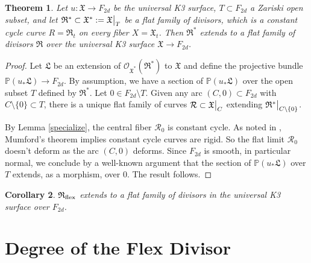 \documentclass{amsart}
\newtheorem{theorem}{Theorem}[section]
\newtheorem{corollary}[theorem]{Corollary}
\theoremstyle{definition}
\begin{document}
\begin{theorem} Let $u\colon \mathfrak{X}\to F_{2d}$ be the universal K3 surface,
$T\subset F_{2d}$ a Zariski open subset,
and let $\mathfrak{R}^*\subset \mathfrak{X}^*:=\mathfrak{X}\big{|}_T$
be a flat family of divisors, which is a constant cycle curve $R=\mathfrak{R}_t$
on every fiber $X=\mathfrak{X}_t$. Then $\mathfrak{R}^*$ extends to a flat family of divisors
$\mathfrak{R}$ over the universal K3 surface $\mathfrak{X}\to F_{2d}$. \end{theorem}

\begin{proof} Let $\mathfrak{L}$ be an extension of
$\mathcal{O}_{\mathfrak{X}^*}(\mathfrak{R}^*)$ to $\mathfrak{X}$ and define
the projective bundle $\mathbb{P}(u_*\mathfrak{L})\to F_{2d}$. By assumption,
we have a section of $\mathbb{P}(u_*\mathfrak{L})$ over the open subset $T$
defined by $\mathfrak{R}^*$.
Let $0\in F_{2d}\setminus T$. Given any arc $(C,0)\subset F_{2d}$ with
$C\setminus \{0\}\subset T$, there is a unique flat family of curves
$\mathcal{R}\subset \mathfrak{X}\big{|}_C$ extending
$\mathfrak{R}^*\big{|}_{C\setminus \{0\}}$.

By Lemma \ref{specialize},
the central fiber $\mathcal{R}_0$ is constant cycle. 
As noted in \cite[Sec.~2.3]{huybrechts2013curves},
Mumford's theorem \cite{mumford1969rational}
implies constant cycle curves are rigid.
So the flat limit $\mathcal{R}_0$ doesn't deform as the arc
$(C,0)$ deforms. Since $F_{2d}$ is smooth, in particular normal,
we conclude by a well-known argument
\cite[Lem.~3.16]{alexeev2019stable}
that the section of $\mathbb{P}(u_*\mathfrak{L})$ over $T$
extends, as a morphism, over $0$.
 The result follows.\end{proof}

\begin{corollary} $\mathfrak{R}_{\rm flex}$ extends to a flat family of divisors in
the universal K3 surface over $F_{2d}$. \end{corollary}

\section{Degree of the Flex Divisor}
\label{sec:flex-degree}
\end{document}

